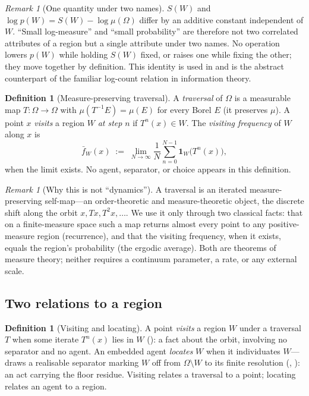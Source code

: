 \documentclass[11pt,a4paper]{article}
\theoremstyle{thmstyle}
\theoremstyle{definition}
\newtheorem{definition}[theorem]{Definition}
\theoremstyle{remark}
\newtheorem{remark}[theorem]{Remark}
\newcommand{\Space}{\Omega}
\begin{document}
\begin{remark}[One quantity under two names]
\label{rem:one-quantity}
$S(W)$ and $\log p(W)=S(W)-\log\mu(\Space)$ differ by an additive constant
independent of $W$. ``Small log-measure'' and ``small probability'' are therefore
not two correlated attributes of a region but a single attribute under two names.
No operation lowers $p(W)$ while holding $S(W)$ fixed, or raises one while fixing
the other; they move together by definition. This identity is used in
 and is the abstract counterpart of the familiar
log-count relation in information theory.
\end{remark}

\begin{definition}[Measure-preserving traversal]
\label{def:traversal}
A \emph{traversal} of $\Space$ is a measurable map $T\colon\Space\to\Space$ with
$\mu(T^{-1}E)=\mu(E)$ for every Borel $E$ \textup{(}it preserves $\mu$\textup{)}.
A point $x$ \emph{visits} a region $W$ \emph{at step} $n$ if $T^{n}(x)\in W$. The
\emph{visiting frequency} of $W$ along $x$ is
\[
\bar f_W(x)\;:=\;\lim_{N\to\infty}\frac1N\sum_{n=0}^{N-1}\mathbf 1_W\!\bigl(T^{n}(x)\bigr),
\]
when the limit exists. No agent, separator, or choice appears in this definition.
\end{definition}

\begin{remark}[Why this is not ``dynamics'']
\label{rem:not-dynamics}
A traversal is an iterated measure-preserving self-map---an order-theoretic and
measure-theoretic object, the discrete shift along the orbit
$x,Tx,T^2x,\dots$. We use it only through two classical facts: that on a
finite-measure space such a map returns almost every point to any positive-measure
region (recurrence), and that the visiting frequency, when it exists, equals the
region's probability (the ergodic average). Both are theorems of measure theory;
neither requires a continuum parameter, a rate, or any external scale.
\end{remark}

\subsection{Two relations to a region}

\begin{definition}[Visiting and locating]
\label{def:visit-locate}
A point \emph{visits} a region $W$ under a traversal $T$ when some iterate
$T^{n}(x)$ lies in $W$ \textup{(}\textup{)}: a fact about the
orbit, involving no separator and no agent. An embedded agent \emph{locates} $W$
when it individuates $W$---draws a realisable separator marking $W$ off from
$\Space\setminus W$ to its finite resolution \textup{(},
\textup{)}: an act carrying the floor residue. Visiting
relates a traversal to a point; locating relates an agent to a region.
\end{definition}
\end{document}
